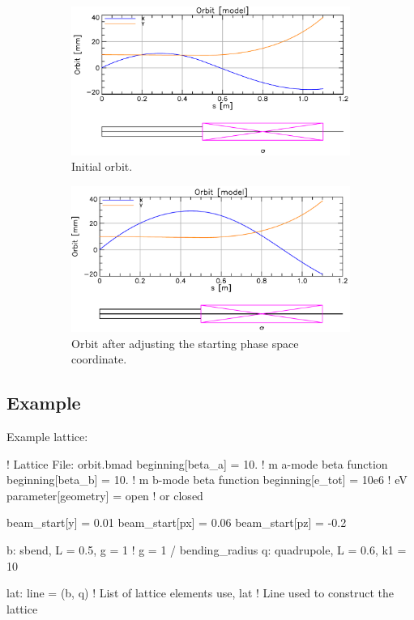 \documentclass{hitec}
\begin{document}
\begin{figure}[tb]
  \centering
  \begin{subfigure}[b]{0.48\textwidth}
    \includegraphics[width=\textwidth]{phase0.pdf}
    \caption{Initial orbit.}
    \label{f:phase0}
  \end{subfigure}
  \hfil
  \begin{subfigure}[b]{0.48\textwidth}
    \includegraphics[width=\textwidth]{phase1.pdf}
    \caption{Orbit after adjusting the starting  phase space coordinate.}
    \label{f:phase1}
  \end{subfigure}
  \caption{}
\end{figure}

\subsection{Example}

Example lattice:
\begin{code}
! Lattice File: orbit.bmad
beginning[beta_a] = 10.     ! m  a-mode beta function
beginning[beta_b] = 10.     ! m  b-mode beta function
beginning[e_tot] = 10e6     ! eV
parameter[geometry] = open  ! or closed

beam_start[y] = 0.01
beam_start[px] = 0.06
beam_start[pz] = -0.2

b: sbend, L = 0.5, g = 1    ! g = 1 / bending_radius
q: quadrupole, L = 0.6, k1 = 10

lat: line = (b, q)      ! List of lattice elements
use, lat                ! Line used to construct the lattice
\end{code}
\end{document}
